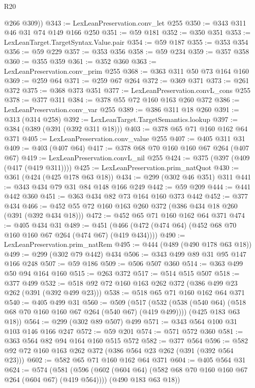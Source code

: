 \begin{lexlean}{R20}
\begin{coremodule}
        @266
        @309))
@343 := LexLeanPreservation.conv_let @255
@350 := @343 @311 @46 @31 @74 @149 @166 @250
@351 := @59 @181
@352 := @350 @351
@353 := LexLeanTarget.TargetSyntax.Value.pair
@354 := @59 @187
@355 := @353 @354
@356 := @59 @229
@357 := @353 @356
@358 := @59 @234
@359 := @357 @358
@360 := @355 @359
@361 := @352 @360
@363 := LexLeanPreservation.conv_prim @255
@368 := @363 @311 @50 @73 @164 @160
@369 := @259 @64
@371 := @259 @67 @264
@372 := @369 @371
@373 := @261 @372
@375 := @368 @373 @351
@377 := LexLeanPreservation.convL_cons @255
@378 := @377 @311
@384 := @378 @55 @72 @160 @163 @260 @372
@386 := LexLeanPreservation.conv_var @255
@389 := @386 @311 @18 @260
@391 := @313 (@314 @258)
@392 := LexLeanTarget.TargetSemantics.lookup
@397 := @384 (@389 (@391 (@392 @311 @18)))
@403 := @378 @65 @71 @160 @162 @64 @371
@405 := LexLeanPreservation.conv_value @255
@407 := @405 @311 @31
@409 := @403 (@407 @64)
@417 := @378 @68 @70 @160 @160 @67 @264 (@407 @67)
@419 := LexLeanPreservation.convL_nil @255
@424 := @375 (@397 (@409 (@417 (@419 @311))))
@425 := LexLeanPreservation.prim_natQuot
@430 := @361 (@424 (@425 @178 @63 @18))
@434 := @299 (@302 @46 @351) @311
@441 := @343 @434 @79 @31 @84 @148 @166 @249
@442 := @59 @209
@444 := @441 @442 @360
@451 := @363 @434 @82 @73 @164 @160 @373 @442
@452 := @377 @434
@466 := @452 @55 @72 @160 @163 @260 @372 (@386 @434 @18 @260 (@391 (@392 @434 @18)))
@472 := @452 @65 @71 @160 @162 @64 @371
@474 := @405 @434 @31
@489 := @451 (@466 (@472 (@474 @64) (@452 @68 @70 @160 @160 @67 @264 (@474 @67) (@419 @434))))
@490 := LexLeanPreservation.prim_natRem
@495 := @444 (@489 (@490 @178 @63 @18))
@499 := @299 (@302 @79 @442) @434
@506 := @343 @499 @89 @31 @95 @147 @166 @248
@507 := @59 @186
@509 := @506 @507 @360
@514 := @363 @499 @50 @94 @164 @160
@515 := @263 @372
@517 := @514 @515 @507
@518 := @377 @499
@532 := @518 @92 @72 @160 @163 @262 @372 (@386 @499 @23 @262 (@391 (@392 @499 @23)))
@538 := @518 @65 @71 @160 @162 @64 @371
@540 := @405 @499 @31
@560 := @509
    (@517
      (@532 (@538 (@540 @64) (@518 @68 @70 @160 @160 @67 @264 (@540 @67) (@419 @499))))
      (@425 @183 @63 @18))
@564 := @299 (@302 @89 @507) @499
@571 := @343 @564 @100 @31 @103 @146 @166 @247
@572 := @59 @201
@574 := @571 @572 @360
@581 := @363 @564 @82 @94 @164 @160 @515 @572
@582 := @377 @564
@596 := @582 @92 @72 @160 @163 @262 @372 (@386 @564 @23 @262 (@391 (@392 @564 @23)))
@602 := @582 @65 @71 @160 @162 @64 @371
@604 := @405 @564 @31
@624 := @574
    (@581
      (@596 (@602 (@604 @64) (@582 @68 @70 @160 @160 @67 @264 (@604 @67) (@419 @564))))
      (@490 @183 @63 @18))

\end{coremodule}
\end{lexlean}
